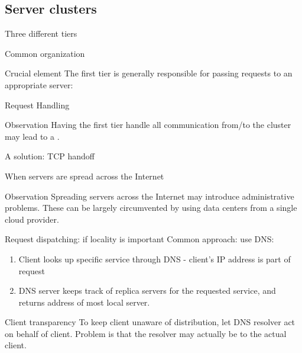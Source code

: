 \subsection{Server clusters}
\begin{slide}{Three different tiers}
  \begin{block}{Common organization}
    \begin{center}
    \end{center}
  \end{block}
  \begin{alertblock}{Crucial element} 
    The first tier is generally responsible for passing requests to an appropriate server: 
  \end{alertblock}
\end{slide}
\begin{slide}{Request Handling}
  \begin{block}{Observation} 
    Having the first tier handle all communication from/to the cluster may lead to a .
  \end{block}
  \begin{exampleblock}{A solution: TCP handoff} 
    \begin{center}
    \end{center}
  \end{exampleblock}
\end{slide}
\begin{slide}{When servers are spread across the Internet}
  \begin{block}{Observation}
    Spreading servers across the Internet may introduce administrative problems. These can be largely
    circumvented by using data centers from a single cloud provider.
  \end{block}
  \begin{block}{Request dispatching: if locality is important}
    Common approach: use DNS:
    \begin{enumerate}\tightlist
    \item Client looks up specific service through DNS - client's IP address is part of request
    \item DNS server keeps track of replica servers for the requested service, and returns address of most
      local server.
    \end{enumerate}
  \end{block}
  \begin{alertblock}{Client transparency}
    To keep client unaware of distribution, let DNS resolver act on behalf of client. Problem is that the
    resolver may actually be  to the actual client.
  \end{alertblock}
\end{slide}
